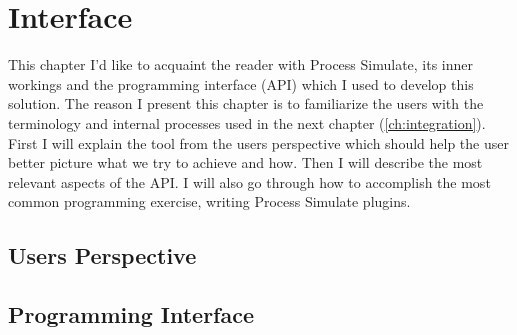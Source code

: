 \chapter{Interface}
\label{ch:interface}
\graphicspath{{chapters/Interface/}}

This chapter I'd like to acquaint the reader with Process Simulate, its inner workings and the programming interface (API) which I used to develop this solution. The reason I present this chapter is to familiarize the users with the terminology and internal processes used in the next chapter (\ref{ch:integration}). First I will explain the tool from the users perspective which should help the user better picture what we try to achieve and how. Then I will describe the most relevant aspects of the API. I will also go through how to accomplish the most common programming exercise, writing Process Simulate plugins.

\section{Users Perspective}



\section{Programming Interface}

